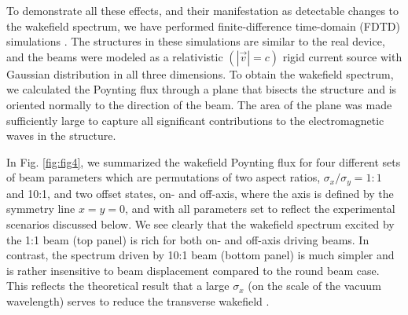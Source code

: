 \documentclass{article}
\begin{document}
To demonstrate all these effects, and their manifestation as detectable changes to the wakefield spectrum, we have performed finite-difference time-domain (FDTD) simulations \cite{Oskooi2010}. The structures in these simulations are similar to the real device, and the beams were modeled as a relativistic $(|\vec{v}|=c)$ rigid current source with Gaussian distribution in all three dimensions. To obtain the wakefield spectrum, we calculated the Poynting flux through a plane that bisects the structure and is oriented normally to the direction of the beam. The area of the plane was made sufficiently large to capture all significant contributions to the electromagnetic waves in the structure.

In Fig. \ref{fig:fig4}, we summarized the wakefield Poynting flux for four different sets of beam parameters which are permutations of two aspect ratios, $\sigma_x/\sigma_y=1:1$ and 10:1, and two offset states, on- and off-axis, where the axis is defined by the symmetry line $x=y=0$, and with all parameters set to reflect the experimental scenarios discussed below. We see clearly that the wakefield spectrum excited by the 1:1 beam (top panel) is rich for both on- and off-axis driving beams. In contrast, the spectrum driven by 10:1 beam (bottom panel) is much simpler and is rather insensitive to beam displacement compared to the round beam case. This reflects the theoretical result that a large $\sigma_x$ (on the scale of the vacuum wavelength) serves to reduce the transverse wakefield \cite{Tremaine1997}.
\end{document}

